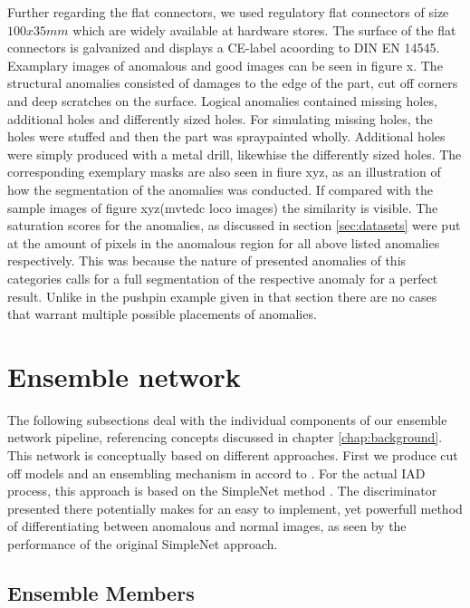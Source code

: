 Further regarding the flat connectors, we used regulatory flat connectors of size $100x35 mm$ which are widely available at hardware stores. The surface of the flat connectors is galvanized 
and displays a CE-label acoording to DIN EN 14545.
Examplary images of anomalous and good images can be seen in figure x. The structural anomalies consisted of damages to the edge of the part, cut off corners and deep scratches on the surface. 
Logical anomalies contained missing holes, additional holes and differently sized holes. For simulating missing holes, the holes were stuffed and then the part was spraypainted wholly. 
Additional holes were simply produced with a metal drill, likewhise the differently sized holes. 
The corresponding exemplary masks are also seen in fiure xyz, as an illustration of how the segmentation of the anomalies was conducted. If compared with the sample images of figure xyz(mvtedc loco images) 
the similarity is visible. The saturation scores for the anomalies, as discussed in section \ref{sec:datasets} were put at the amount of pixels in the anomalous region for all above listed anomalies respectively.
This was because the nature of presented anomalies of this categories calls for a full segmentation of the respective anomaly for a perfect result. Unlike in the pushpin example given in that section 
there are no cases that warrant multiple possible placements of anomalies.


\section{Ensemble network}
\label{sec:ourensemblenetwork}

The following subsections deal with the individual components of our ensemble network pipeline, referencing concepts discussed in chapter \ref{chap:background}. This network is conceptually based on 
different approaches. First we produce cut off models and an ensembling mechanism in accord to \cite{EnsembleHeller2023}. For the actual IAD process, this approach is based on the SimpleNet method \cite{liu2023simplenet}. 
The discriminator presented there potentially makes for an easy to implement, yet powerfull method of differentiating between anomalous and normal images, as seen by the performance of the original 
SimpleNet approach. 


\subsection{Ensemble Members}
\label{sec:ensemblecandidates}

